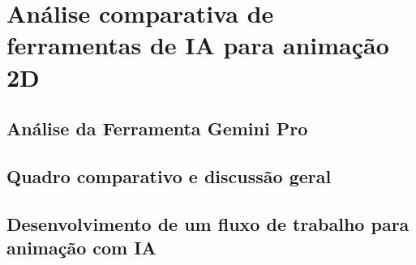 \chapter{Análise comparativa de ferramentas de IA para animação 2D}
\label{c.ferramentas}

















\FloatBarrier
\section{Análise da Ferramenta Gemini Pro}
\label{s.ferramentaB}


\FloatBarrier
\section{Quadro comparativo e discussão geral}
\label{s.quadroComparativo}

\FloatBarrier
\section{Desenvolvimento de um fluxo de trabalho para animação com IA}
\label{s.pipeline}
